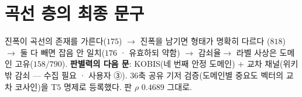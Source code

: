 \documentclass[10pt,a4paper]{article}
\begin{document}
\section{곡선 층의 최종 문구}

진폭이 곡선의 존재를 가른다($175$) $\to$ 진폭을 남기면 형태가 명확히 다르다
($818$) $\to$ 둘 다 빼면 잡음 안 일치($176$ · 유효하되 약함) $\to$ 감쇠율$\to$
라벨 사상은 도메인 고유($158/790$). \textbf{판별력의 다음 문}: KOBIS(네 번째
안정 도메인) $+$ 교차 채널(위키 밖 감쇠 --- 수집 필요 · 사용자 ③). $36$축 공유
기저 검증(도메인별 중요도 벡터의 교차 코사인)을 T$5$ 명제로 등록했다. 판 $\rho$
$0.4689$ 그대로.
\end{document}
